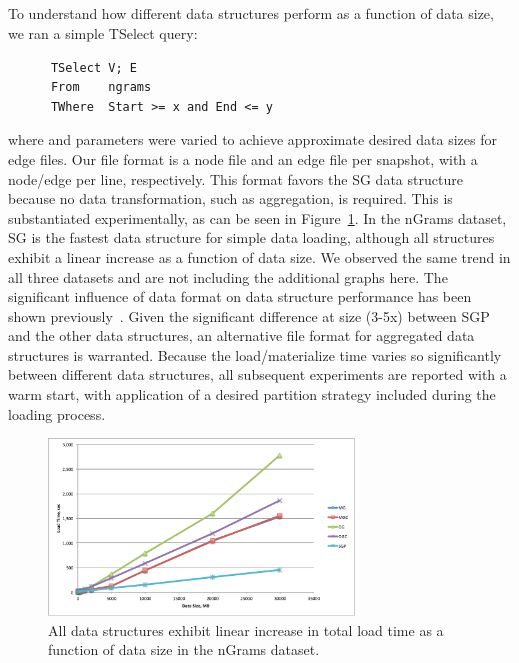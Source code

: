 \subsection{}

To understand how different data structures perform as a function of
data size, we ran a simple TSelect query:

\begin{small}
\begin{verbatim}
      TSelect V; E
      From    ngrams
      TWhere  Start >= x and End <= y
\end{verbatim}
\end{small}

where  and  parameters were varied to achieve
approximate desired data sizes for edge files.  Our file format is a
node file and an edge file per snapshot, with a node/edge per line,
respectively.  This format favors the SG data structure because no
data transformation, such as aggregation, is required.  This is
substantiated experimentally, as can be seen in
Figure~\ref{fig:tselect}.  In the nGrams dataset, SG is the fastest
data structure for simple data loading, although all structures
exhibit a linear increase as a function of data size.  We observed the
same trend in all three datasets and are not including the additional
graphs here.   The significant influence of data format on data structure
performance has been shown
previously~\cite{DBLP:journals/tos/MiaoHLWYZPCC15}.  Given the
significant difference at size (3-5x) between SGP and the other data
structures, an alternative file format for aggregated data structures
is warranted.  Because the load/materialize time varies so
significantly between different data structures, all subsequent
experiments are reported with a warm start, with application of a
desired partition strategy included during the loading process.

\begin{figure}[t!]
\includegraphics[width=3.2in]{figs/tselect.pdf}
\caption{All data structures exhibit linear increase in total load
  time as a function of data size in the nGrams dataset.}
\label{fig:tselect}
\end{figure}


